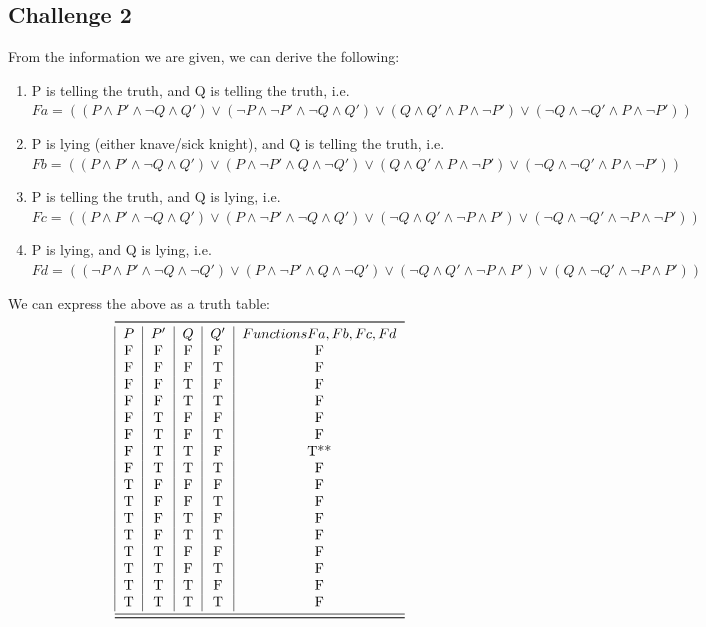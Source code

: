 \documentclass[12pt]{article}
\begin{document}
\pagebreak

\subsection*{Challenge 2}
From the information we are given, we can derive the following:\\
\begin{enumerate}
\item
P is telling the truth, and Q is telling the truth, i.e.\\
$Fa = ((P \land P' \land \neg Q \land Q') \lor (\neg P \land \neg P' \land \neg Q \land Q') \lor (Q \land Q' \land P \land \neg P') \lor (\neg Q \land \neg Q' \land P \land \neg P'))$
\item
P is lying (either knave/sick knight), and Q is telling the truth, i.e.\\
$Fb = ((P \land P' \land \neg Q \land Q') \lor (P \land \neg P' \land Q \land \neg Q') \lor (Q \land Q' \land P \land \neg P') \lor (\neg Q \land \neg Q' \land P \land \neg P'))$
\item
P is telling the truth, and Q is lying, i.e.\\
$Fc = ((P \land P' \land \neg Q \land Q') \lor (P \land \neg P' \land \neg Q \land Q') \lor (\neg Q \land Q' \land \neg P \land P') \lor (\neg Q \land \neg Q' \land \neg P \land \neg P'))$
\item
P is lying, and Q is lying, i.e.\\
$Fd = ((\neg P \land P' \land \neg Q \land \neg Q') \lor (P \land \neg P' \land Q \land \neg Q') \lor (\neg Q \land Q' \land \neg P \land P') \lor (Q \land \neg Q' \land \neg P \land P'))$
\end{enumerate}
We can express the above as a truth table:\\
\[
\begin{tabular}{*{5}{|c}}
\toprule
$P$ & $P'$ & $Q$ & $Q'$ & $Functions Fa, Fb, Fc, Fd$ \\
   F & F & F & F & F\\
   F & F & F & T & F\\
   F & F & T & F & F\\
   F & F & T & T & F\\
   F & T & F & F & F\\
   F & T & F & T & F\\
   F & T & T & F & T**\\
   F & T & T & T & F\\
   T & F & F & F & F\\
   T & F & F & T & F\\
   T & F & T & F & F\\
   T & F & T & T & F\\
   T & T & F & F & F\\
   T & T & F & T & F\\
   T & T & T & F & F\\
   T & T & T & T & F\\   
\midrule
\bottomrule
\end{tabular}
\]
\\
\end{document}
